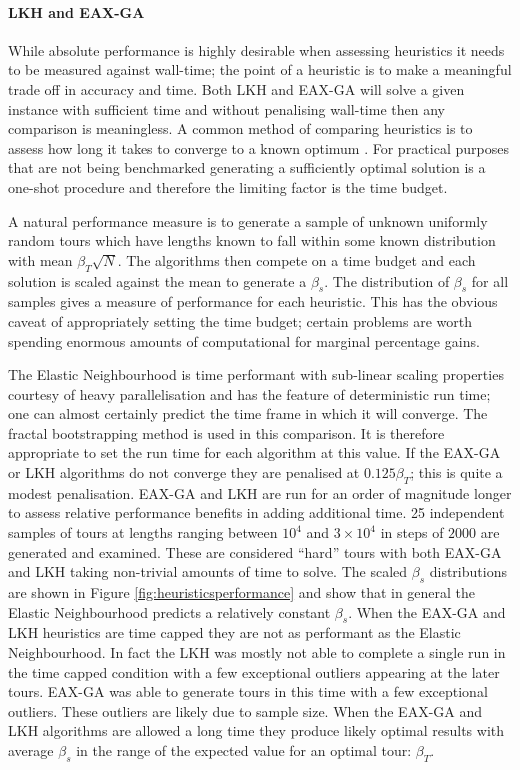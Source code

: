 \paragraph{LKH and EAX-GA}
While absolute performance is highly desirable when assessing heuristics it needs to be measured against wall-time; the point of a heuristic is to make a meaningful trade off in accuracy and time. Both LKH and EAX-GA will solve a given instance with sufficient time and without penalising wall-time then any comparison is meaningless. A common method of comparing heuristics is to assess how long it takes to converge to a known optimum \cite{McMenemy2019-rl}. For practical purposes that are not being benchmarked generating a sufficiently optimal solution is a one-shot procedure and therefore the limiting factor is the time budget. 

A natural performance measure is to generate a sample of unknown uniformly random tours which have lengths known to fall within some known distribution with mean $\beta_T\sqrt{N}$. The algorithms then compete on a time budget and each solution is scaled against the mean to generate a $\beta_s$. The distribution of $\beta_s$ for all samples gives a measure of performance for each heuristic. This has the obvious caveat of appropriately setting the time budget; certain problems are worth spending enormous amounts of computational for marginal percentage gains.

The Elastic Neighbourhood is time performant with sub-linear scaling properties courtesy of heavy parallelisation and has the feature of deterministic run time; one can almost certainly predict the time frame in which it will converge. The fractal bootstrapping method is used in this comparison. It is therefore appropriate to set the run time for each algorithm at this value. If the EAX-GA or LKH algorithms do not converge they are penalised at  $0.125\beta_T$; this is quite a modest penalisation. EAX-GA and LKH are run for an order of magnitude longer to assess relative performance benefits in adding additional time. 25 independent samples of tours at lengths ranging between $10^4$ and $3 \times 10^4$ in steps of $2000$ are generated and examined. These are considered ``hard'' tours with both EAX-GA and LKH taking non-trivial amounts of time to solve. The scaled $\beta_s$ distributions are shown in Figure \ref{fig:heuristicsperformance} and show that in general the Elastic Neighbourhood predicts a relatively constant $\beta_s$. When the EAX-GA and LKH heuristics are time capped they are not as performant as the Elastic Neighbourhood. In fact the LKH was mostly not able to complete a single run in the time capped condition with a few exceptional outliers appearing at the later tours. EAX-GA was able to generate tours in this time with a few exceptional outliers. These outliers are likely due to sample size. When the EAX-GA and LKH algorithms are allowed a long time they produce likely optimal results with average $\beta_s$ in the range of the expected value for an optimal tour: $\beta_T$.

